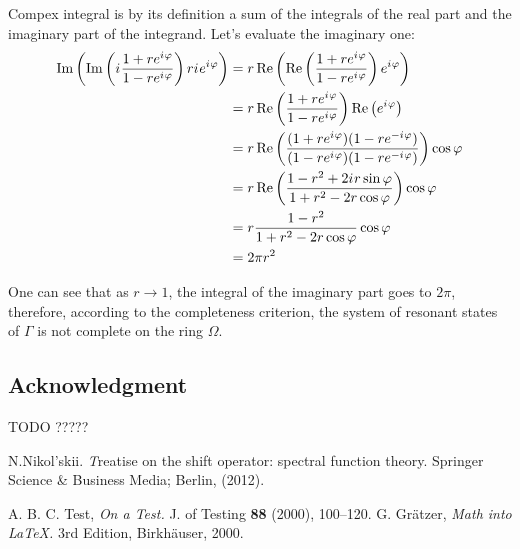 \documentclass{birkjour}
\theoremstyle{definition}
\theoremstyle{remark}
\numberwithin{equation}{section}
\newcommand{\eexp}[1]{e^{#1}}
\newcommand{\iu}{{i\mkern1mu}}
\renewcommand{\Re}{\operatorname{Re}}
\renewcommand{\Im}{\operatorname{Im}}
\renewcommand{\phi}{\varphi}
\begin{document}
Compex integral is by its definition a sum of the integrals of the real part and the imaginary part of the integrand. Let's evaluate the imaginary one:
\begin{align*}
\Im \left(  \Im \left( \iu \frac{1 + r \eexp{\iu \phi}}{1 - r \eexp{\iu \phi}} \right) r \iu \eexp{\iu \phi} \right)
 &= r \Re \left(  \Re \left( \frac{1 + r \eexp{\iu \phi}}{1 - r \eexp{\iu \phi}} \right) \eexp{\iu \phi} \right) \\
 &= r \Re \left( \frac{1 + r \eexp{\iu \phi}}{1 - r \eexp{\iu \phi}} \right) \Re \left(   \eexp{\iu \phi} \right) \\
 &= r \Re \left( \frac{(1 + r \eexp{\iu \phi}) (1 - r \eexp{-\iu \phi}) }{(1 - r \eexp{\iu \phi}) (1 - r \eexp{-\iu \phi})} \right) \cos \phi \\
 &= r \Re \left( \frac{1 - r^2 + 2 \iu r \sin \phi}{1 + r^2 - 2 r \cos \phi} \right) \cos \phi \\
 &= r \frac{1 - r^2}{1 + r^2 - 2 r \cos \phi} \cos \phi \\
 &= 2 \pi r^2
\end{align*}

One can see that as $r \to 1$, the integral of the imaginary part goes to $2 \pi$, therefore, according to the completeness criterion, the system of resonant states of $\Gamma$ is not complete on the ring $\Omega$.


\subsection*{Acknowledgment}
TODO ?????


\begin{thebibliography}{1}
N.Nikol'skii. {\textit Treatise on the shift operator: spectral
function theory}. Springer Science \& Business Media; Berlin,
(2012).

 A. B. C. Test, \textit{On a Test.} J. of Testing
\textbf{88} (2000), 100--120.
 G. Gr\"atzer, \textit{Math into \LaTeX.} 3rd Edition,
Birkh\"auser, 2000.
\end{thebibliography}

\end{document}

